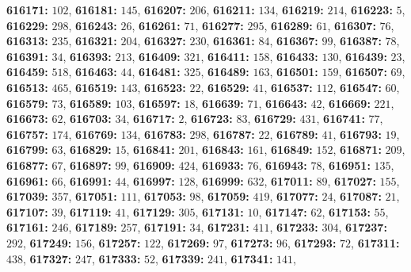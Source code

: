 \textsf{\bfseries 616171:} $102$, \textsf{\bfseries 616181:} $145$, \textsf{\bfseries 616207:} $206$, \textsf{\bfseries 616211:} $134$, \textsf{\bfseries 616219:} $214$, \textsf{\bfseries 616223:} $5$, \textsf{\bfseries 616229:} $298$, \textsf{\bfseries 616243:} $26$, \textsf{\bfseries 616261:} $71$, \textsf{\bfseries 616277:} $295$, \textsf{\bfseries 616289:} $61$, \textsf{\bfseries 616307:} $76$, \textsf{\bfseries 616313:} $235$, \textsf{\bfseries 616321:} $204$, \textsf{\bfseries 616327:} $230$, \textsf{\bfseries 616361:} $84$, \textsf{\bfseries 616367:} $99$, \textsf{\bfseries 616387:} $78$, \textsf{\bfseries 616391:} $34$, \textsf{\bfseries 616393:} $213$, \textsf{\bfseries 616409:} $321$, \textsf{\bfseries 616411:} $158$, \textsf{\bfseries 616433:} $130$, \textsf{\bfseries 616439:} $23$, \textsf{\bfseries 616459:} $518$, \textsf{\bfseries 616463:} $44$, \textsf{\bfseries 616481:} $325$, \textsf{\bfseries 616489:} $163$, \textsf{\bfseries 616501:} $159$, \textsf{\bfseries 616507:} $69$, \textsf{\bfseries 616513:} $465$, \textsf{\bfseries 616519:} $143$, \textsf{\bfseries 616523:} $22$, \textsf{\bfseries 616529:} $41$, \textsf{\bfseries 616537:} $112$, \textsf{\bfseries 616547:} $60$, \textsf{\bfseries 616579:} $73$, \textsf{\bfseries 616589:} $103$, \textsf{\bfseries 616597:} $18$, \textsf{\bfseries 616639:} $71$, \textsf{\bfseries 616643:} $42$, \textsf{\bfseries 616669:} $221$, \textsf{\bfseries 616673:} $62$, \textsf{\bfseries 616703:} $34$, \textsf{\bfseries 616717:} $2$, \textsf{\bfseries 616723:} $83$, \textsf{\bfseries 616729:} $431$, \textsf{\bfseries 616741:} $77$, \textsf{\bfseries 616757:} $174$, \textsf{\bfseries 616769:} $134$, \textsf{\bfseries 616783:} $298$, \textsf{\bfseries 616787:} $22$, \textsf{\bfseries 616789:} $41$, \textsf{\bfseries 616793:} $19$, \textsf{\bfseries 616799:} $63$, \textsf{\bfseries 616829:} $15$, \textsf{\bfseries 616841:} $201$, \textsf{\bfseries 616843:} $161$, \textsf{\bfseries 616849:} $152$, \textsf{\bfseries 616871:} $209$, \textsf{\bfseries 616877:} $67$, \textsf{\bfseries 616897:} $99$, \textsf{\bfseries 616909:} $424$, \textsf{\bfseries 616933:} $76$, \textsf{\bfseries 616943:} $78$, \textsf{\bfseries 616951:} $135$, \textsf{\bfseries 616961:} $66$, \textsf{\bfseries 616991:} $44$, \textsf{\bfseries 616997:} $128$, \textsf{\bfseries 616999:} $632$, \textsf{\bfseries 617011:} $89$, \textsf{\bfseries 617027:} $155$, \textsf{\bfseries 617039:} $357$, \textsf{\bfseries 617051:} $111$, \textsf{\bfseries 617053:} $98$, \textsf{\bfseries 617059:} $419$, \textsf{\bfseries 617077:} $24$, \textsf{\bfseries 617087:} $21$, \textsf{\bfseries 617107:} $39$, \textsf{\bfseries 617119:} $41$, \textsf{\bfseries 617129:} $305$, \textsf{\bfseries 617131:} $10$, \textsf{\bfseries 617147:} $62$, \textsf{\bfseries 617153:} $55$, \textsf{\bfseries 617161:} $246$, \textsf{\bfseries 617189:} $257$, \textsf{\bfseries 617191:} $34$, \textsf{\bfseries 617231:} $411$, \textsf{\bfseries 617233:} $304$, \textsf{\bfseries 617237:} $292$, \textsf{\bfseries 617249:} $156$, \textsf{\bfseries 617257:} $122$, \textsf{\bfseries 617269:} $97$, \textsf{\bfseries 617273:} $96$, \textsf{\bfseries 617293:} $72$, \textsf{\bfseries 617311:} $438$, \textsf{\bfseries 617327:} $247$, \textsf{\bfseries 617333:} $52$, \textsf{\bfseries 617339:} $241$, \textsf{\bfseries 617341:} $141$, 
